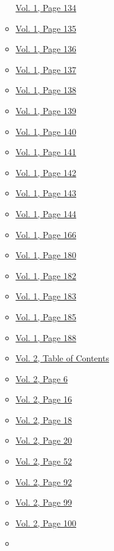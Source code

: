 \begin{itemize}
\begin{itemize}
    \protect\hyperlink{g-page-142}{Vol. 1, Page 134}
  \item
    \protect\hyperlink{g-page-143}{Vol. 1, Page 135}
  \item
    \protect\hyperlink{g-page-144}{Vol. 1, Page 136}
  \item
    \protect\hyperlink{g-page-145}{Vol. 1, Page 137}
  \item
    \protect\hyperlink{g-page-146}{Vol. 1, Page 138}
  \item
    \protect\hyperlink{g-page-147}{Vol. 1, Page 139}
  \item
    \protect\hyperlink{g-page-148}{Vol. 1, Page 140}
  \item
    \protect\hyperlink{g-page-149}{Vol. 1, Page 141}
  \item
    \protect\hyperlink{g-page-150}{Vol. 1, Page 142}
  \item
    \protect\hyperlink{g-page-151}{Vol. 1, Page 143}
  \item
    \protect\hyperlink{g-page-152}{Vol. 1, Page 144}
  \item
    \protect\hyperlink{g-page-174}{Vol. 1, Page 166}
  \item
    \protect\hyperlink{g-page-188}{Vol. 1, Page 180}
  \item
    \protect\hyperlink{g-page-190}{Vol. 1, Page 182}
  \item
    \protect\hyperlink{g-page-191}{Vol. 1, Page 183}
  \item
    \protect\hyperlink{g-page-193}{Vol. 1, Page 185}
  \item
    \protect\hyperlink{g-page-196}{Vol. 1, Page 188}
  \item
    \protect\hyperlink{g-page-211}{Vol. 2, Table of Contents}
  \item
    \protect\hyperlink{g-page-218}{Vol. 2, Page 6}
  \item
    \protect\hyperlink{g-page-228}{Vol. 2, Page 16}
  \item
    \protect\hyperlink{g-page-230}{Vol. 2, Page 18}
  \item
    \protect\hyperlink{g-page-232}{Vol. 2, Page 20}
  \item
    \protect\hyperlink{g-page-264}{Vol. 2, Page 52}
  \item
    \protect\hyperlink{g-page-304}{Vol. 2, Page 92}
  \item
    \protect\hyperlink{g-page-311}{Vol. 2, Page 99}
  \item
    \protect\hyperlink{g-page-312}{Vol. 2, Page 100}
  \item

\end{itemize}
\end{itemize}
